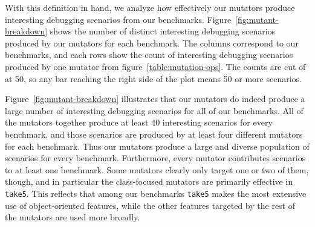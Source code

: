 With this definition in hand, we analyze how effectively our mutators produce interesting debugging scenarios from our benchmarks.
Figure~\ref{fig:mutant-breakdown} shows the number of distinct interesting debugging scenarios produced by our mutators for each benchmark.
The columns correspond to our benchmarks, and each rows show the count of interesting debugging scenarios produced by one mutator from figure~\ref{table:mutation-ops}.
The counts are cut of at 50, so any bar reaching the right side of the plot means 50 or more scenarios.

Figure~\ref{fig:mutant-breakdown} illustrates that our mutators do indeed produce a large number of interesting debugging scenarios for all of our benchmarks.
All of the mutators together produce at least 40 interesting scenarios for every benchmark, and those scenarios are produced by at least four different mutators for each benchmark.
Thus our mutators produce a large and diverse population of scenarios for every benchmark.
Furthermore, every mutator contributes scenarios to at least one benchmark.
Some mutators clearly only target one or two of them, though, and in particular the class-focused mutators are primarily effective in \texttt{take5}.
This reflects that among our benchmarks \texttt{take5} makes the most extensive use of object-oriented features, while the other features targeted by the rest of the mutators are used more broadly.

